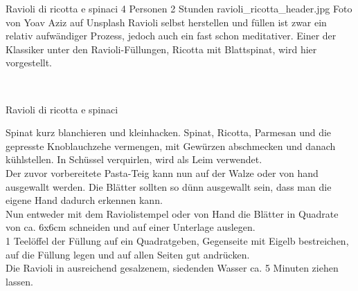 \begin{myrecipe}
    {Ravioli di ricotta e spinaci}
    {4 Personen}
    {2 Stunden}
    {ravioli_ricotta_header.jpg}
    {Foto von Yoav Aziz auf Unsplash}
    \freeform
    \large Ravioli selbst herstellen und füllen ist zwar ein relativ aufwändiger Prozess, jedoch auch ein fast schon meditativer. Einer der Klassiker unter den Ravioli-Füllungen, Ricotta mit Blattspinat, wird hier vorgestellt.
    \freeform
    \newpage

    \freeform
    \mbox{}\\[-\baselineskip]%
    \parbox[b]{\textwidth}{%
    \rule{0pt}{\baselineskip}%
    \strut{\recipetitlefont Ravioli di ricotta e spinaci}\strut\hfill}%

    Spinat kurz blanchieren und kleinhacken. Spinat, Ricotta, Parmesan und die gepresste Knoblauchzehe vermengen, mit Gewürzen abschmecken und danach kühlstellen.
    In Schüssel verquirlen, wird als Leim verwendet.
    \freeform
    \\Der zuvor vorbereitete Pasta-Teig kann nun auf der Walze oder von hand ausgewallt werden. Die Blätter sollten so dünn ausgewallt sein, dass man die eigene Hand dadurch erkennen kann.
    \\Nun entweder mit dem Raviolistempel oder von Hand die Blätter in Quadrate von ca. 6x6cm schneiden und auf einer Unterlage auslegen.
    \\1 Teelöffel der Füllung auf ein Quadratgeben, Gegenseite mit Eigelb bestreichen, auf die Füllung legen und auf allen Seiten gut andrücken.
    \freeform
    \\Die Ravioli in ausreichend gesalzenem, siedenden Wasser ca. 5 Minuten ziehen lassen.
    \freeform
\end{myrecipe}
\clearpage